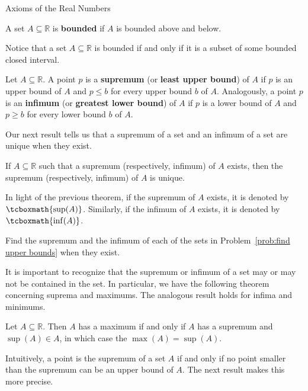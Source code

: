 \begin{section}{Axioms of the Real Numbers}
\begin{definition}
A set $A\subseteq \mathbb{R}$ is \textbf{bounded} if $A$ is bounded above and below.
\end{definition}

Notice that a set $A\subseteq\mathbb{R}$ is bounded if and only if it is a subset of some bounded closed interval.

\begin{definition}
Let $A\subseteq \mathbb{R}$. A point $p$ is a \textbf{supremum} (or \textbf{least upper bound}) of $A$ if $p$ is an upper bound of $A$ and $p\leq b$ for every upper bound $b$ of $A$.  Analogously, a point $p$ is an \textbf{infimum} (or \textbf{greatest lower bound}) of $A$ if $p$ is a lower bound of $A$ and $p\geq b$ for every lower bound $b$ of $A$. 
\end{definition}

Our next result tells us that a supremum of a set and an infimum of a set are unique when they exist.

\begin{theorem}
If $A\subseteq \mathbb{R}$ such that a supremum (respectively, infimum) of $A$ exists, then the supremum (respectively, infimum) of $A$ is unique.
\end{theorem}

In light of the previous theorem, if the supremum of $A$ exists, it is denoted by $\tcboxmath{\sup(A)}$. Similarly, if the infimum of $A$ exists, it is denoted by $\tcboxmath{\inf(A)}$. 

\begin{problem}
Find the supremum and the infimum of each of the sets in Problem~\ref{prob:find upper bounds} when they exist.
\end{problem}

It is important to recognize that the supremum or infimum of a set may or may not be contained in the set. In particular, we have the following theorem concerning suprema and maximums. The analogous result holds for infima and minimums.

\begin{theorem}
Let $A\subseteq \mathbb{R}$. Then $A$ has a maximum if and only if $A$ has a supremum and $\sup(A)\in A$, in which case the $\max(A)=\sup(A)$.
\end{theorem}

Intuitively, a point is the supremum of a set $A$ if and only if no point smaller than the supremum can be an upper bound of $A$. The next result makes this more precise.


\end{section}
